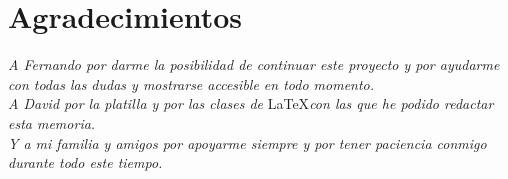 \chapter*{Agradecimientos}
\large{\textit{A Fernando por darme la posibilidad de continuar este proyecto y por ayudarme con todas las dudas y mostrarse accesible en todo momento.}\\

\textit{A David por la platilla y por las clases de} \LaTeX \textit{\hspace{2mm}con las que he podido redactar esta memoria.}\\

\textit{Y a mi familia y amigos por apoyarme siempre y por tener paciencia conmigo durante todo este tiempo.}}